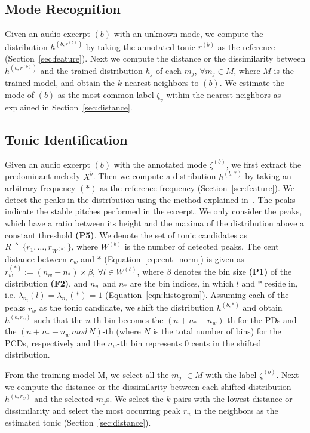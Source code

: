 \documentclass{sig-alternate}
\begin{document}
\subsection{Mode Recognition}\label{sec:mode}
Given an audio excerpt $(b)$ with an unknown mode, we compute the distribution $h^{\left(b, r^{(b)}\right)}$ by taking the annotated tonic $r^{(b)}$ as the reference (Section~\ref{sec:feature}). Next we compute the distance or the dissimilarity between $h^{\left(b, r^{(b)}\right)}$ and the trained distribution $h_j$ of each $m_j$, $\forall m_j \in M$, where $M$ is the trained model, and obtain the $k$ nearest neighbors to $(b)$. We estimate the mode of $(b)$ as the most common label $\zeta_v$ within the nearest neighbors as explained in Section~\ref{sec:distance}.

\subsection{Tonic Identification}\label{sec:tonic}

Given an audio excerpt $(b)$ with the annotated mode $\zeta^{(b)}$, we first extract the predominant melody $X^{b}$. Then we compute a distribution $h^{(b, *)}$ by taking an arbitrary frequency $(*)$ as the reference frequency (Section~\ref{sec:feature}). We detect the peaks in the distribution using the method explained in~\cite{smith1987parshl}. The peaks indicate the stable pitches performed in the excerpt. We only consider the peaks, which have a ratio between its height and the maxima of the distribution above a constant threshold {\bf (P5)}. We denote the set of tonic candidates as $R \triangleq \{r_1, \dots, r_{W^{(b)}}\}$, where $W^{(b)}$ is the number of detected peaks. The cent distance between $r_w$ and $*$ (Equation~\ref{eq:cent_norm}) is given as $r_w^{(*)} := \left(n_w - n_*\right) \times \beta,\,\forall l \in W^{(b)}$, where $\beta$ denotes the bin size {\bf (P1)} of the distribution {\bf (F2)}, and $n_w$ and $n_*$ are the bin indices, in which $l$ and $*$ reside in, i.e. $\lambda_{n_{l}}(l) = \lambda_{n_{*}}(*) = 1$ (Equation~\ref{eqn:histogram}). Assuming each of the peaks $r_w$ as the tonic candidate, we shift the distribution $h^{(b, *)}$ and obtain $h^{(b, r_w)}$ such that the $n$-th bin becomes the $(n + n_* - n_w)$-th for the PDs and the $(n + n_* - n_w \, mod \, N)$-th (where $N$ is the total number of bins) for the PCDs, respectively and the $n_w$-{th} bin represents $0$ cents in the shifted distribution.

From the training model M, we select all the $m_j$ $\in M$ with the label $\zeta^{(b)}$. Next we compute the distance or the dissimilarity between each shifted distribution $h^{(b, r_w)}$ and the selected $m_j$s. We select the $k$ pairs with the lowest distance or dissimilarity and select the most occurring peak $r_w$ in the neighbors as the estimated tonic (Section~\ref{sec:distance}).
\end{document}
